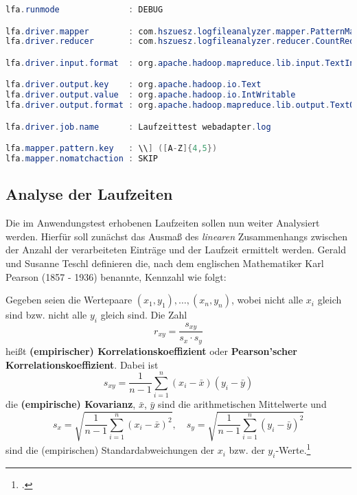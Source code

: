 \begin{lstlisting}[language=Java,caption=Properties für Anwendungstest,label=lis:PropertiesAnwendungstest]
lfa.runmode              : DEBUG

lfa.driver.mapper        : com.hszuesz.logfileanalyzer.mapper.PatternMapper
lfa.driver.reducer       : com.hszuesz.logfileanalyzer.reducer.CountReducer

lfa.driver.input.format  : org.apache.hadoop.mapreduce.lib.input.TextInputFormat

lfa.driver.output.key    : org.apache.hadoop.io.Text
lfa.driver.output.value  : org.apache.hadoop.io.IntWritable
lfa.driver.output.format : org.apache.hadoop.mapreduce.lib.output.TextOutputFormat

lfa.driver.job.name      : Laufzeittest webadapter.log

lfa.mapper.pattern.key   : \\] ([A-Z]{4,5})
lfa.mapper.nomatchaction : SKIP
\end{lstlisting}

\subsection{Analyse der Laufzeiten}
Die im Anwendungstest erhobenen Laufzeiten sollen nun weiter Analysiert werden. Hierfür soll zunächst das Ausmaß des \textit{linearen} Zusammenhangs zwischen der Anzahl der verarbeiteten Einträge und der Laufzeit ermittelt werden. Gerald und Susanne Teschl definieren die, nach dem englischen Mathematiker Karl Pearson (1857 - 1936) benannte, Kennzahl wie folgt:

\flqq Gegeben seien die Wertepaare $(x_1,y_1), \dots,(x_n,y_n)$, wobei nicht alle $x_i$ gleich sind bzw. nicht alle $y_i$ gleich sind. Die Zahl
\begin{equation*}
r_{xy} = \frac{s_{xy}}{s_x \cdot s_y}
\end{equation*} 
heißt \textbf{(empirischer) Korrelationskoeffizient} oder \textbf{Pearson'scher Korrelationskoeffizient}. Dabei ist
\begin{equation*}
s_{xy} = \frac{1}{n-1} \displaystyle\sum_{i=1}^{n} (x_i - \bar{x})(y_i - \bar{y})
\end{equation*}
die \textbf{(empirische) Kovarianz}, $\bar{x}$, $\bar{y}$ sind die arithmetischen Mittelwerte und
\begin{equation*}
s_x = \sqrt{\frac{1}{n-1} \displaystyle\sum_{i=1}^{n} (x_i - \bar{x})^2}, \quad s_y = \sqrt{\frac{1}{n-1} \displaystyle\sum_{i=1}^{n} (y_i - \bar{y})^2}
\end{equation*}
sind die (empirischen) Standardabweichungen der $x_i$ bzw. der $y_i$-Werte.\frqq\footcite[S. 213]{Teschl.2014}


